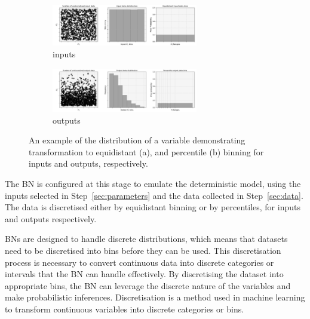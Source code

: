 \documentclass[journal]{IEEEtran}
\begin{document}
\begin{figure}[t]
    \centering
    \begin{minipage}{\textwidth}
        \begin{subfigure}{\textwidth}
            \centering
            \includegraphics[width=0.7\textwidth]{figures/TE_results/march_data/equidistant_binning.png}
            \caption{\small inputs}\label{fig:input_dist_eg}
        \end{subfigure}
    \end{minipage}
    \begin{minipage}{\textwidth}
        \begin{subfigure}{\textwidth}
            \centering
            \includegraphics[width=0.7\textwidth]{figures/TE_results/march_data/percentile_binning.png}
            \caption{\small outputs}\label{fig:output_dist_eg}
        \end{subfigure}
    \end{minipage}
    \caption{\small An example of the distribution of a variable demonstrating transformation to equidistant (a), and percentile (b) binning for inputs and outputs, respectively.}\label{fig:dists_eg}
\end{figure}

The BN is configured at this stage to emulate the deterministic model, using the inputs selected in Step~\ref{sec:parameters} and the data collected in Step~\ref{sec:data}. The data is discretised either by equidistant binning or by percentiles, for inputs and outputs respectively.

BNs are designed to handle discrete distributions, which means that datasets need to be discretised into bins before they can be used. This discretisation process is necessary to convert continuous data into discrete categories or intervals that the BN can handle effectively. By discretising the dataset into appropriate bins, the BN can leverage the discrete nature of the variables and make probabilistic inferences. Discretisation is a method used in machine learning to transform continuous variables into discrete categories or bins.
\end{document}
